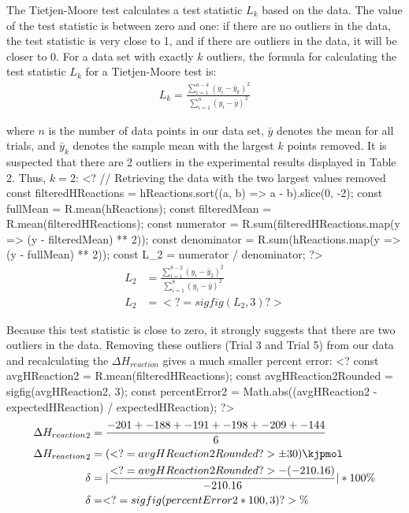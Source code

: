 \documentclass[12pt, notitlepage, letterpaper]{report}
\begin{document}
The Tietjen-Moore test calculates a test statistic $L_k$ based on the data. The value of the test statistic is between zero and one: if there are no outliers in the data, the test statistic is very close to 1, and if there are outliers in the data, it will be closer to 0. For a data set with exactly $k$ outliers, the formula for calculating the test statistic $L_k$ for a Tietjen-Moore test is:
\begin{align*}
	L_k = \frac{\sum_{i=1}^{n-k}(y_i-\bar{y}_k)^2}{\sum_{i=1}^{n}(y_i-\bar{y})^2}
\end{align*}

where $n$ is the number of data points in our data set, $\bar{y}$ denotes the mean for all trials, and $\bar{y}_k$ denotes the sample mean with the largest $k$ points removed. It is suspected that there are 2 outliers in the experimental results displayed in Table 2. Thus, $k = 2$:
%
<?
// Retrieving the data with the two largest values removed
const filteredHReactions = hReactions.sort((a, b) => a - b).slice(0, -2);
const fullMean = R.mean(hReactions);
const filteredMean = R.mean(filteredHReactions);
const numerator = R.sum(filteredHReactions.map(y => (y - filteredMean) ** 2));
const denominator = R.sum(hReactions.map(y => (y - fullMean) ** 2));
const L_2 = numerator / denominator;
?>
%
\begin{align*}
	L_2 & = \frac{\sum_{i=1}^{8-2}(y_i-\bar{y}_2)^2}{\sum_{i=1}^{8}(y_i-\bar{y})^2} \\
	L_2 & = <?= sigfig(L_2, 3) ?>
\end{align*}

Because this test statistic is close to zero, it strongly suggests that there are two outliers in the data. Removing these outliers (Trial 3 and Trial 5) from our data and recalculating the $\Delta H_{reaction}$ gives a much smaller percent error:
%
<?
const avgHReaction2 = R.mean(filteredHReactions);
const avgHReaction2Rounded = sigfig(avgHReaction2, 3);
const percentError2 = Math.abs((avgHReaction2 - expectedHReaction) / expectedHReaction);
?>
%
\begin{align*}
	\Delta {H_{reaction}}_{2} & = \frac{-201 + -188 + -191 + -198 + -209 + -144}{6}                 \\
	\Delta {H_{reaction}}_{2} & = (<?= avgHReaction2Rounded ?> \pm 30)\kjpmol                       \\
	\delta                    & = |\frac{<?= avgHReaction2Rounded ?> - (-210.16)}{-210.16}| * 100\% \\
	\delta                    & = <?= sigfig(percentError2 * 100, 3) ?>\%
\end{align*}
\end{document}
